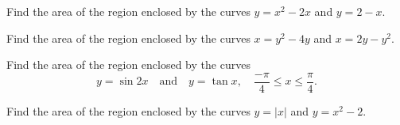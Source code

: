 \documentclass[
  course = {{MATH102 Calculus II}},
  quartile = {{2}},
  assignment = {{Section 6.1}},%
  firstexercise = 1,
  term = 203
]{../class/aga-homework}
\begin{document}
\problem Find the area of the region enclosed by the curves $\displaystyle y = x^2-2x$ and $\displaystyle y=2-x$.
\newpage


\problem Find the area of the region enclosed by the curves $\displaystyle x = y^2 - 4y$ and $\displaystyle x = 2y - y^2$.
\newpage



\problem Find the area of the region enclosed by the curves
\[
\displaystyle
y = \sin 2x \quad \text{and}\quad y=\tan x, \quad \frac{-\pi}{4}\leq x\leq \frac{\pi}{4}.
\]
\newpage


\problem Find the area of the region enclosed by the curves $\displaystyle y = |x|$ and $\displaystyle y=x^2-2$.
\newpage
\end{document}
